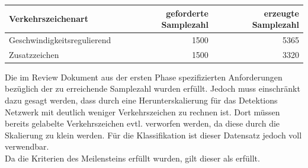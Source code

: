 \documentclass[12pt,a4paper,ngerman,enabledeprecatedfontcommands]{scrreprt}
\begin{document}
\begin{longtabu}{|X[l]|r|r|}
    \hline
    Verkehrszeichenart & geforderte Samplezahl & erzeugte Samplezahl\\
    \hline
    Geschwindigkeitsregulierend & 1500 & 5365 \\
    \hline
    Zusatzzeichen & 1500 & 3320 \\
    \hline
\end{longtabu}

Die im Review Dokument aus der ersten Phase spezifizierten Anforderungen bezüglich der zu erreichende Samplezahl wurden erfüllt. Jedoch muss einschränkt dazu gesagt werden, dass durch eine Herunterskalierung für das Detektions Netzwerk mit deutlich weniger Verkehrszeichen zu rechnen ist. Dort müssen bereits gelabelte Verkehrszeichen evtl. verworfen werden, da diese durch die Skalierung zu klein werden. Für die Klassifikation ist dieser Datensatz jedoch voll verwendbar.\\
Da die Kriterien des Meilensteins erfüllt wurden, gilt dieser als erfüllt.\\

\end{document}
